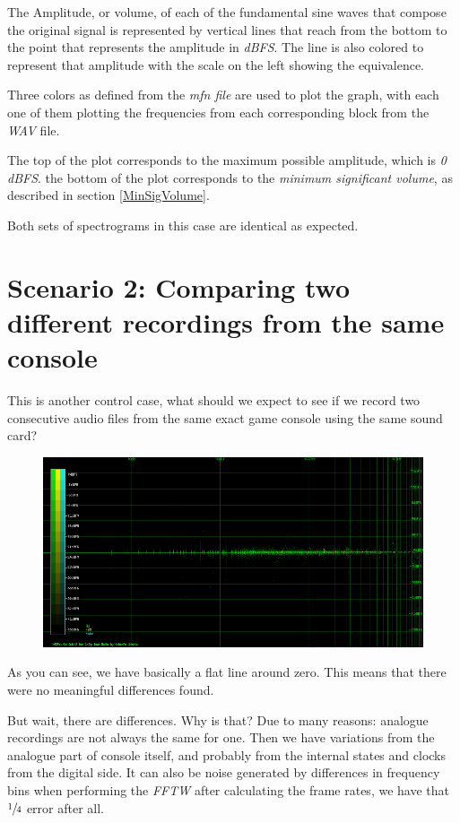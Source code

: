 \documentclass[10pt,a4paper]{report}
\begin{document}
The Amplitude, or volume, of each of the fundamental sine waves that compose the original signal is represented by vertical lines that reach from the bottom to the point that represents the amplitude in \textit{dBFS}\cite{dbfs}. The line is also colored to represent that amplitude with the scale on the left showing the equivalence.

Three colors as defined from the \textit{mfn file} are used to plot the graph, with each one of them plotting the frequencies from each corresponding block from the \textit{WAV} file.

The top of the plot corresponds to the maximum possible amplitude, which is \textit{0 dBFS}. the bottom of the plot corresponds to the \textit{minimum significant volume}, as described in section \ref*{MinSigVolume}.

Both sets of spectrograms in this case are identical as expected. 

\section{Scenario 2: Comparing two different recordings from the same console}

This is another control case, what should we expect to see if we record two consecutive audio files from the same exact game console using the same sound card?

\begin{figure}[H]
	\centering
	\includegraphics[width=1\linewidth]{plots/Plot2-Sameconsole.png}
	\caption{}
	\label{fig:plot2-sameconsole}
\end{figure}

As you can see, we have basically a flat line around zero. This means that there were no meaningful differences found. 

But wait, there are differences. Why is that? Due to many reasons: analogue recordings are not always the same for one. Then we have variations from the analogue part of console itself, and probably from the internal states and clocks from the digital side. It can also be noise generated by differences in frequency bins when performing the \textit{FFTW} after calculating the frame rates, we have that $\sfrac{1}{4}$ error after all.
\end{document}
